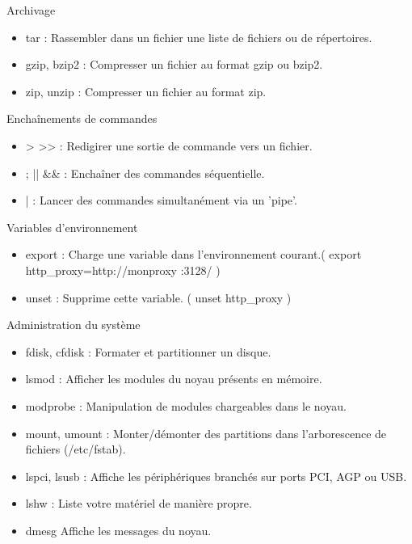 \documentclass[10pt]{beamer}
\begin{document}
\begin{frame}{Archivage}
\begin{itemize}
\item \alert{tar} : Rassembler dans un fichier une liste de fichiers ou de répertoires.
\item \alert{gzip}, \alert{bzip2} : Compresser un fichier au format gzip ou bzip2.
\item \alert{zip}, \alert{unzip} : Compresser un fichier au format zip.
\end{itemize}
\end{frame}
\begin{frame}{Enchaînements de commandes}
\begin{itemize}
\item \alert{>} \alert{>>} : Redigirer une sortie de commande vers un fichier.
\item \alert{;} \alert{||} \alert{\&\&} : Enchaîner des commandes séquentielle.
\item \alert{|} : Lancer des commandes simultanément via un 'pipe'.
\end{itemize}
\end{frame}

\begin{frame}{Variables d'environnement}
\begin{itemize}
\item \alert{export} : Charge une variable dans l'environnement courant.( export http\_proxy=http://monproxy :3128/ )
\item \alert{unset} : Supprime cette variable. ( unset http\_proxy )
\end{itemize}
\end{frame}

\begin{frame}{Administration du système}
\begin{itemize}
\item \alert{fdisk}, \alert{cfdisk} : Formater et partitionner un disque.
\item \alert{lsmod} : Afficher les modules du noyau présents en mémoire.
\item \alert{modprobe} : Manipulation de modules chargeables dans le noyau.
\item \alert{mount}, \alert{umount} : Monter/démonter des partitions dans l'arborescence de fichiers (/etc/fstab).
\item \alert{lspci}, \alert{lsusb} : Affiche les périphériques branchés sur ports PCI, AGP ou USB.
\item \alert{lshw} : Liste votre matériel de manière propre.
\item \alert{dmesg} Affiche les messages du noyau.
\end{itemize}
\end{frame}
\end{document}
